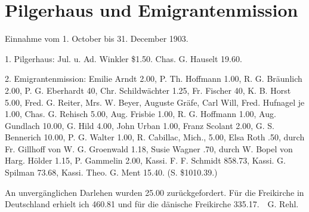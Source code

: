 \chapter{Pilgerhaus und Emigrantenmission}

Einnahme vom 1. October bis 31. December 1903.

1. Pilgerhaus: Jul. u. Ad. Winkler \$1.50. Chas. G. Hauselt 19.60.

2. Emigrantenmission: Emilie Arndt 2.00, P. Th. Hoffmann 1.00, R. G. Bräunlich 2.00, P. G. Eberhardt 40, Chr. Schildwächter 1.25, Fr. Fischer 40, K. B. Horst 5.00, Fred. G. Reiter, Mrs. W. Beyer, Auguste Gräfe, Carl Will, Fred. Hufnagel je 1.00, Chas. G. Rehisch 5.00, Aug. Frisbie 1.00, R. G. Hoffmann 1.00, Aug. Gundlach 10.00, G. Hild 4.00, John Urban 1.00, Franz Scolant 2.00, G. S. Bennerich 10.00, P. G. Walter 1.00, R. Cabillac, Mich., 5.00, Elsa Roth .50, durch Fr. Gillhoff von W. G. Groenwald 1.18, Susie Wagner .70, durch W. Bopel von Harg. Hölder 1.15, P. Gammelin 2.00, Kassi. F. F. Schmidt 858.73, Kassi. G. Spilman 73.68, Kassi. Theo. G. Ment 15.40. (S. \$1010.39.)

An unvergänglichen Darlehen wurden 25.00 zurückgefordert. Für die Freikirche in Deutschland erhielt ich 460.81 und für die dänische Freikirche 335.17. G. Rehl.
